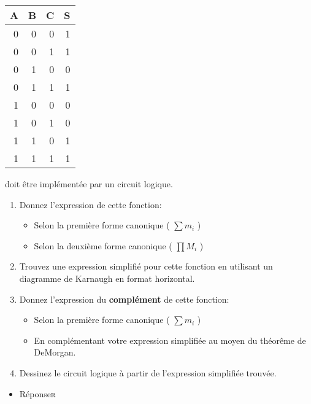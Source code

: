 \documentclass[11pt]{article}
\begin{document}
\begin{center}
\begin{tabular}{rrrr}
A & B & C & S\\
\hline
0 & 0 & 0 & 1\\
0 & 0 & 1 & 1\\
0 & 1 & 0 & 0\\
0 & 1 & 1 & 1\\
1 & 0 & 0 & 0\\
1 & 0 & 1 & 0\\
1 & 1 & 0 & 1\\
1 & 1 & 1 & 1\\
\end{tabular}
\end{center}

doit être implémentée par un circuit logique.

\begin{enumerate}
\item Donnez l'expression de cette fonction:

\begin{itemize}
\item Selon la première forme canonique ( \(\sum m_i\) )

\item Selon la deuxième forme canonique ( \(\prod M_i\) )
\end{itemize}

\item Trouvez une expression simplifié pour cette fonction en utilisant
un diagramme de Karnaugh en format horizontal.

\item Donnez l'expression du \textbf{complément} de cette fonction:

\begin{itemize}
\item Selon la première forme canonique ( \(\sum m_i\) )

\item En complémentant votre expression simplifiée au moyen du
théorême de DeMorgan.
\end{itemize}

\item Dessinez le circuit logique à partir de l'expression simplifiée
trouvée.
\end{enumerate}

\begin{itemize}
\item Réponse\hfill{}\textsc{r}
\label{sec:org5626dcb}
\end{itemize}
\end{document}
